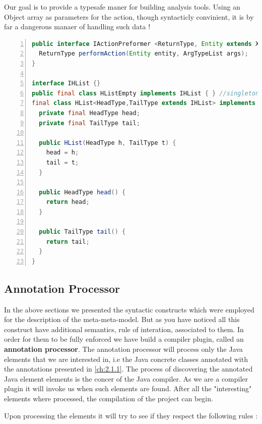         Our goal is to provide a typesafe maner for building analysis tools. Using an Object array as parameters for the action, though syntacticly convinient, it is by far a dangerous manaer of handling 
such data !

\small
\begin{lstlisting}[language=Java, numbers=left]
public interface IActionPreformer <ReturnType, Entity extends XEntity, ArgTypeList extends IHList> {
  ReturnType performAction(Entity entity, ArgTypeList args);
}

interface IHList {}
public final class HListEmpty implements IHList { } //singleton element
final class HList<HeadType,TailType extends IHList> implements IHList {
  private final HeadType head;
  private final TailType tail;
            
  public HList(HeadType h, TailType t) {
    head = h;
    tail = t;
  }
    
  public HeadType head() {
    return head;
  }

  public TailType tail() {
    return tail;
  }
}
\end{lstlisting}
\normalsize{} \label{codeSelection:IActionPreformer}


\subsection{Annotation Processor}\label{ch:2.1.3}

        In the above sections we presented the syntactic constructs which were employed for the description of the meta-meta-model. But as you have noticed all this construct have additional
semantics, rule of interation, associated to them. In order for them to be fully enforced we have build a compiler plugin, called an \textbf{annotation processor}. The annotation processor
will process only the Java elements that we are interested in, i.e the Java concrete classes annotated with the annotations presented in \ref{ch:2.1.1}. The process of discovering the 
annotated Java element elements is the concer of the Java compiler. As we are a compiler plugin it will invoke us when such elements are found. After all the "interesting" elements 
where processed, the compilation of the project can begin.
        
        Upon processing the elements it will try to see if they respect the following rules \cite{oldThesis}:

